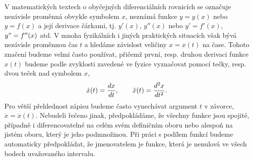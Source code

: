     \begin{mdframed}[style=mdnote] 
      V matematických textech o obyčejných diferenciálních rovnicích se označuje nezávisle proměnná 
      obvykle symbolem \(x\), neznámá funkce \(y = y(x)\) nebo \(y = f(x)\) a její derivace 
      čárkami, tj. \(y'(x)\), \(y''(x)\) nebo \(y' = f'(x)\), \(y" = f''(x)\) atd. V mnoha 
      fyzikálních i jiných praktických situacích však bývá nezávisle proměnnou čas \(t\) a hledáme 
      závislost veličiny \(x = x(t)\) na čase. Tohoto značení budeme velmi často používat, přičemž 
      první, resp. druhou derivaci funkce \(x(t)\) budeme podle zvyklosti zavedené ve fyzice 
      vyznačovat pomocí tečky, resp. dvou teček nad symbolem \(x\),
      \begin{equation*}
        \dot{x}(t) = \dfrac{d x}{d t}, \qquad \ddot{x}(t) = \dfrac{d^2 x}{d t^2}.
      \end{equation*}
      Pro větší přehlednost zápisu budeme často vynechávat argument \(t\) v závorce, \(\dot{x} = 
      \dot{x}(t)\). Nebudeli řečeno jinak, předpokládáme, že všechny funkce jsou spojité, případně 
      i diferencovatelné na celém svém definičním oboru nebo alespoň na jistém oboru, který je jeho 
      podmnožinou. Při práci s podílem funkcí budeme automaticky předpokládat, že jmenovatelem je 
      funkce, která je nenulová ve všech bodech uvažovaného intervalu.      
    \end{mdframed}
    
